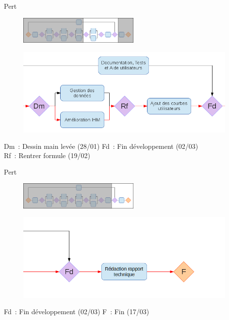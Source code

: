 \documentclass{beamer}
\begin{document}
	\begin{frame}{Pert}
		\begin{figure}
			\includegraphics[width=6cm]
				{../Lancement/ImagesLancement/miniature3.png}
		\end{figure}\begin{figure}
			\includegraphics[width=11cm]
				{../Lancement/ImagesLancement/pert_part_3.png}
		\end{figure}
		\footnotesize{Dm~: Dessin main lev\'ee (28/01) \hfill Fd~: Fin 
			d\'eveloppement (02/03)\\
			\hfill Rf~: Rentrer formule (19/02)\hspace*{\fill}}
	\end{frame}

	\begin{frame}{Pert}
		\begin{figure}
			\includegraphics[width=6cm]
				{../Lancement/ImagesLancement/miniature4.png}
		\end{figure}\begin{figure}
			\includegraphics[width=11cm]
				{../Lancement/ImagesLancement/pert_part_4.png}
		\end{figure}
		\footnotesize{Fd~: Fin d\'eveloppement (02/03) \hfill F~: Fin (17/03)\\
			[0.48cm]}
	\end{frame}
	
\end{document}
